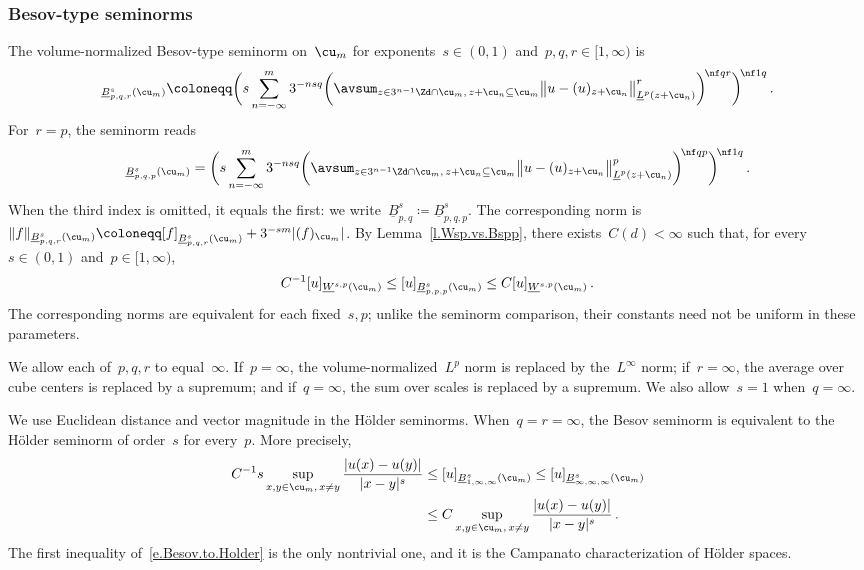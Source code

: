 \documentclass[11pt]{amsart}
\begin{document}
\subsubsection*{Besov-type seminorms}
The volume-normalized Besov-type seminorm on~$\cu_m$ for exponents~$s\in(0,1)$ and~$p,q,r\in[1,\infty)$ is
\begin{equation}
	[  u ]_{\underline{B}^s_{p,q,r}(\cu_m)}
	\coloneqq
	\biggl(
	s
	\sum_{n=-\infty}^m
	3^{-nsq}
	\biggl(
	\avsum_{z\in 3^{n-1} \Zd \cap \cu_m, \, z+\cu_n \subseteq \cu_m}
	\bigl\| u - (u)_{z+\cu_n} \bigr\|_{\underline{L}^p(z+\cu_n)}^r
	\biggr)^{\!\nf qr} \biggr)^{\!\nf1q} \,.
	\label{e.Besov.Morrey.seminorm}
\end{equation}
For~$r=p$, the seminorm reads
\begin{equation*}
	[  u ]_{\underline{B}^s_{p,q,p}(\cu_m)}
	=
	\biggl(
	s \sum_{n=-\infty}^m
	3^{-nsq}
	\biggl(
	\avsum_{z\in 3^{n-1} \Zd \cap \cu_m, \, z+\cu_n \subseteq \cu_m}
	\bigl\| u - (u)_{z+\cu_n} \bigr\|_{\underline{L}^p(z+\cu_n)}^p
	\biggr)^{\!\nf qp} \biggr)^{\!\nf1q} \,.
\end{equation*}
When the third index is omitted, it equals the first: we write~$\underline B^s_{p,q}\coloneqq\underline B^s_{p,q,p}$. The corresponding norm is~$\|f\|_{\underline B^s_{p,q,r}(\cu_m)} \coloneqq[f]_{\underline B^s_{p,q,r}(\cu_m)} +3^{-sm}|(f)_{\cu_m}|$. By Lemma~\ref{l.Wsp.vs.Bspp}, there exists~$C(d)<\infty$ such that, for every~$s\in(0,1)$ and~$p\in[1,\infty)$,
\begin{equation}
	C^{-1} [  u ]_{\underline{W}^{s,p}(\cu_m)}
	\leq
	[ u ]_{\underline{B}^s_{p,p,p}(\cu_m)}
	\leq
	C [  u ]_{\underline{W}^{s,p}(\cu_m)}
	\,.
	\label{e.Wsp.vs.Bspp.intro}
\end{equation}
The corresponding norms are equivalent for each fixed~$s,p$; unlike the seminorm comparison, their constants need not be uniform in these parameters.

\smallskip

We allow each of~$p,q,r$ to equal~$\infty$.  If~$p=\infty$, the volume-normalized~$L^p$ norm is replaced by the~$L^\infty$ norm; if~$r=\infty$, the average over cube centers is replaced by a supremum; and if~$q=\infty$, the sum over scales is replaced by a supremum.  We also allow~$s=1$ when~$q=\infty$.

\smallskip

We use Euclidean distance and vector magnitude in the H\"older seminorms. When~$q=r=\infty$, the Besov seminorm is equivalent to the H\"older seminorm of order~$s$ for every~$p$. More precisely,
\begin{align}
	C^{-1}s \sup_{x,y\in \cu_m, \, x\neq y}
	\frac{|u(x) - u(y)| }{|x-y|^s }
	&\leq
	[  u ]_{\underline{B}^s_{1,\infty,\infty}(\cu_m)}
	\leq
	[  u ]_{\underline{B}^s_{\infty,\infty,\infty}(\cu_m)}
	\notag \\ &
	\leq
	C \sup_{x,y\in \cu_m, \, x\neq y}
	\frac{|u(x) - u(y)| }{|x-y|^s }\,.
	\label{e.Besov.to.Holder}
\end{align}
The first inequality of~\eqref{e.Besov.to.Holder} is the only nontrivial one, and it is the Campanato characterization of H\"older spaces.
\end{document}
